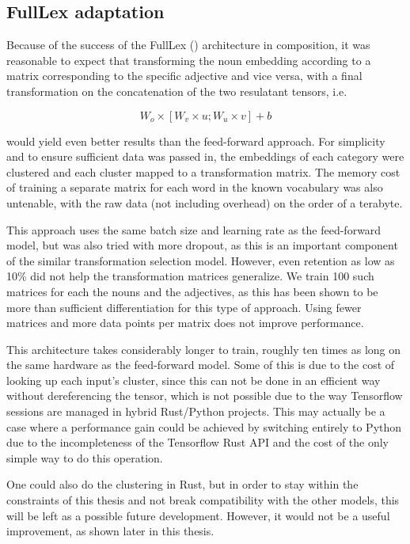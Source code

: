 \documentclass[a4paper, 12pt]{article}
\begin{document}
\subsection{FullLex adaptation}
Because of the success of the FullLex (\cite{SocherFullLex}) architecture in composition, it was reasonable to expect that transforming the noun embedding according to a matrix corresponding to the specific adjective and vice versa, with a final transformation on the concatenation of the two resulatant tensors, i.e.

\begin{equation} \label{eq:6}
	W_o \times [W_v \times u; W_u \times v] + b
\end{equation}

would yield even better results than the feed-forward approach. For simplicity and to ensure sufficient data was passed in, the embeddings of each category were clustered and each cluster mapped to a transformation matrix. The memory cost of training a separate matrix for each word in the known vocabulary was also untenable, with the raw data (not including overhead) on the order of a terabyte.

This approach uses the same batch size and learning rate as the feed-forward model, but was also tried with more dropout, as this is an important component of the similar transformation selection model. However, even retention as low as 10\% did not help the transformation matrices generalize. We train 100 such matrices for each the nouns and the adjectives, as this has been shown to be more than sufficient differentiation for this type of approach. Using fewer matrices and more data points per matrix does not improve performance.

This architecture takes considerably longer to train, roughly ten times as long on the same hardware as the feed-forward model. Some of this is due to the cost of looking up each input's cluster, since this can not be done in an efficient way without dereferencing the tensor, which is not possible due to the way Tensorflow sessions are managed in hybrid Rust/Python projects. This may actually be a case where a performance gain could be achieved by switching entirely to Python due to the incompleteness of the Tensorflow Rust API and the cost of the only simple way to do this operation.

One could also do the clustering in Rust, but in order to stay within the constraints of this thesis and not break compatibility with the other models, this will be left as a possible future development. However, it would not be a useful improvement, as shown later in this thesis.
\end{document}

